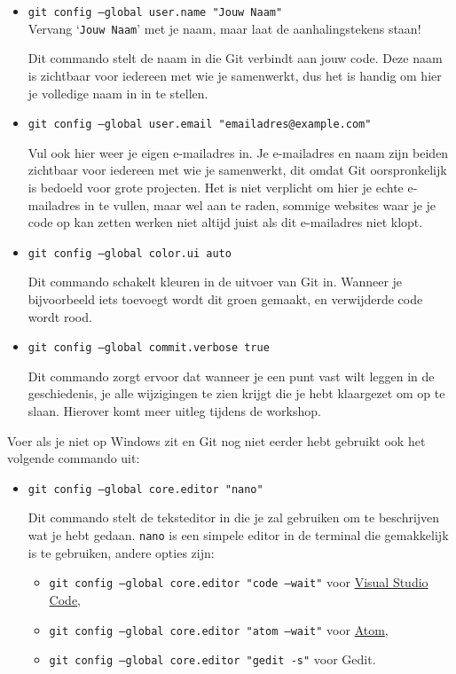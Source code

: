 \documentclass[a4paper]{extarticle}
\newcommand{\shell}[1]{\texttt{#1}}
\begin{document}
\begin{itemize}
	\item \shell{git config --global user.name "Jouw Naam"}\\
		Vervang `\texttt{Jouw Naam}' met je naam, maar laat de aanhalingstekens staan!

		Dit commando stelt de naam in die Git verbindt aan jouw code. Deze naam is zichtbaar voor iedereen met wie je
		samenwerkt, dus het is handig om hier je volledige naam in in te stellen.

	\item \shell{git config --global user.email "emailadres@example.com"}

		Vul ook hier weer je eigen e-mailadres in. Je e-mailadres en naam zijn beiden zichtbaar voor iedereen met wie je
		samenwerkt, dit omdat Git oorspronkelijk is bedoeld voor grote projecten. Het is niet verplicht om hier je echte
		e-mailadres in te vullen, maar wel aan te raden, sommige websites waar je je code op kan zetten werken niet
		altijd juist als dit e-mailadres niet klopt.

	\item \shell{git config --global color.ui auto}

		Dit commando schakelt kleuren in de uitvoer van Git in. Wanneer je bijvoorbeeld iets toevoegt wordt dit groen
		gemaakt, en verwijderde code wordt rood.

	\item \shell{git config --global commit.verbose true}

		Dit commando zorgt ervoor dat wanneer je een punt vast wilt leggen in de geschiedenis, je alle wijzigingen te
		zien krijgt die je hebt klaargezet om op te slaan. Hierover komt meer uitleg tijdens de workshop.
\end{itemize}

Voer als je niet op Windows zit en Git nog niet eerder hebt gebruikt ook het volgende commando uit:
\begin{itemize}
	\item \shell{git config --global core.editor "nano"}

		Dit commando stelt de teksteditor in die je zal gebruiken om te beschrijven wat je hebt gedaan. \shell{nano} is
		een simpele editor in de terminal die gemakkelijk is te gebruiken, andere opties zijn:

		\begin{itemize}
			\item \shell{git config --global core.editor "code --wait"} voor \href{https://code.visualstudio.com}{Visual Studio Code},
			\item \shell{git config --global core.editor "atom --wait"} voor \href{https://atom.io}{Atom},
			\item \shell{git config --global core.editor "gedit -s"} voor Gedit.
		\end{itemize}
\end{itemize}
\end{document}
